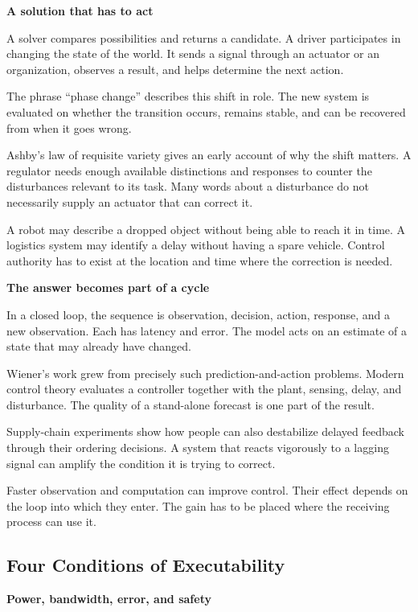 \documentclass[11pt,openany]{book}
\newcommand{\subhead}[1]{\par\medskip\noindent\textbf{#1}\par\nobreak\smallskip}
\begin{document}
\subhead{A solution that has to act}

A solver compares possibilities and returns a candidate. A driver participates in changing the state of the world. It sends a signal through an actuator or an organization, observes a result, and helps determine the next action.

The phrase “phase change” describes this shift in role. The new system is evaluated on whether the transition occurs, remains stable, and can be recovered from when it goes wrong.

Ashby's law of requisite variety gives an early account of why the shift matters.\cite{ashby1956cybernetics} A regulator needs enough available distinctions and responses to counter the disturbances relevant to its task. Many words about a disturbance do not necessarily supply an actuator that can correct it.

A robot may describe a dropped object without being able to reach it in time. A logistics system may identify a delay without having a spare vehicle. Control authority has to exist at the location and time where the correction is needed.

\subhead{The answer becomes part of a cycle}

In a closed loop, the sequence is observation, decision, action, response, and a new observation. Each has latency and error. The model acts on an estimate of a state that may already have changed.

Wiener's work grew from precisely such prediction-and-action problems.\cite{wiener1948} Modern control theory evaluates a controller together with the plant, sensing, delay, and disturbance.\cite{astrom2008} The quality of a stand-alone forecast is one part of the result.

Supply-chain experiments show how people can also destabilize delayed feedback through their ordering decisions.\cite{sterman1989,lee1997} A system that reacts vigorously to a lagging signal can amplify the condition it is trying to correct.

Faster observation and computation can improve control. Their effect depends on the loop into which they enter. The gain has to be placed where the receiving process can use it.

\subsection{Four Conditions of Executability}

\subhead{Power, bandwidth, error, and safety}
\end{document}
